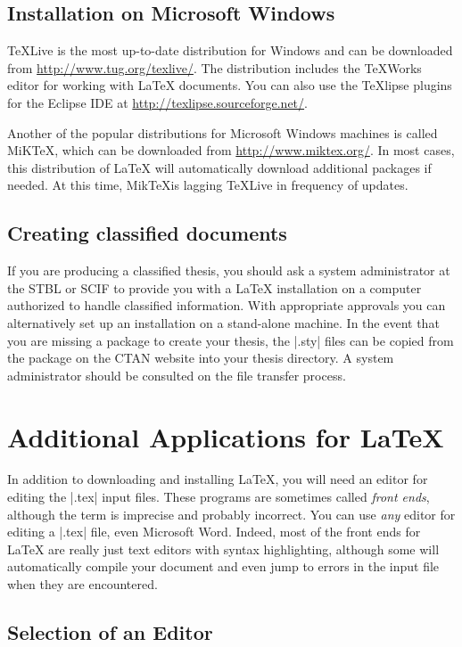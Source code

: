 \subsection{Installation on Microsoft Windows}

\TeX Live is the most up-to-date distribution for Windows and can be downloaded
from \url{http://www.tug.org/texlive/}.  The distribution includes the
{\TeX}Works editor for working with \LaTeX{} documents.  You can also use the
{\TeX}lipse plugins for the Eclipse IDE at
\url{http://texlipse.sourceforge.net/}.

Another of the popular distributions for Microsoft Windows machines is called
MiK\TeX, which can be downloaded from \url{http://www.miktex.org/}.  In most
cases, this distribution of \LaTeX{} will automatically download additional
packages if needed.  At this time, Mik\TeX is lagging \TeX Live in frequency of
updates.

\subsection{Creating classified documents}

If you are producing a classified thesis, you should ask a system administrator
at the STBL or SCIF to provide you with a \LaTeX{} installation on a computer
authorized to handle classified information. With appropriate approvals you can
alternatively set up an installation on a stand-alone machine. In the event
that you are missing a package to create your thesis, the |.sty| files can be
copied from the package on the CTAN website into your thesis directory.  A
system administrator should be consulted on the file transfer process.

\section{Additional Applications for \LaTeX{} }

In addition to downloading and installing \LaTeX, you will need an editor for
editing the |.tex| input files. These programs are sometimes called \emph{front
ends}, although the term is imprecise and probably incorrect. You can use
\emph{any} editor for editing a |.tex| file, even Microsoft Word. Indeed, most
of the front ends for \LaTeX{} are really just text editors with syntax
highlighting, although some will automatically compile your document and even
jump to errors in the input file when they are encountered.

\subsection{Selection of an Editor} 

